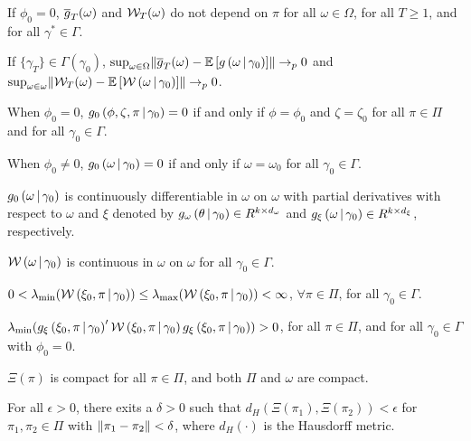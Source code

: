 \documentclass[11pt, letterpaper, twoside, final]{article}
\begin{document}
\begin{appendices}
  \begin{assump}[GMM 1]\label{ass:GMM1}
  \begin{assumplist}
    \item If $\phi_0=0$, $\sampmom(\omega)$ and $\W_{T}(\omega)$ do not depend on $\pi$ for all $\omega \in \Omega$,
      for all $T \geq 1$, and for all $\gamma^{*}\in \Gamma.$ 
      \label{ass:GMM1a}
    \item If $\lbrace \gamma_{T} \rbrace \in \Gamma\left(\gamma_0\right)$, $\sup_{\omega \in \Omega}
      \norm*{\sampmom(\omega) - \E\left[g\left(\omega \mvert \gamma_0\right)\right]} \pto 0$ and $\sup_{\omega
      \in \omega} \norm{\W_{T}(\omega)-\E\left[\W\left(\omega \mvert \gamma_0\right)\right]} \pto 0$.
      \label{ass:GMM1b}
    \item When $\phi_0 = 0$, $g_0\left(\phi, \zeta ,\pi \mvert \gamma_0\right) = 0$ if and only if $\phi
      =\phi_0$ and $\zeta = \zeta_0$ for all $\pi \in \Pi$ and for all $\gamma_0 \in \Gamma.$
      \label{ass:GMM1c}
    \item When $\phi_0 \neq 0$, $g_0\left(\omega \mvert \gamma_0\right)=0$ if and only if $\omega =\omega_0$ for all
      $\gamma_0 \in \Gamma.$
      \label{ass:GMM1d}
    \item $g_0\left(\omega \mvert \gamma_0\right)$ is continuously differentiable in $\omega $ on $\omega$ with
      partial derivatives with respect to $\omega$ and $\xi$ denoted by $g_{\omega}\left(\theta \mvert
      \gamma_0\right) \in R^{k\times d_{\omega }}$ and $g_{\xi }\left(\omega \mvert \gamma_0\right)\in R^{k\times
      d_{\xi }}$, respectively.
      \label{ass:GMM1e}
    \item $\W\left(\omega \mvert \gamma_0\right)$ is continuous in $\omega$ on $\omega$ for all $\gamma_0\in
      \Gamma$. \label{ass:GMM1f}
    \item $0 < \lambda_{\min}(\W\left(\xi_0, \pi \mvert \gamma_0\right))\leq \lambda_{\max }(\W\left(\xi_0,\pi
      \mvert \gamma_0\right)) < \infty$, $\forall \pi \in \Pi$, for all $\gamma_0 \in \Gamma$.
      \label{ass:GMM1g}
    \item $\lambda_{\min} (g_{\xi}\left(\xi_0,\pi \mvert \gamma_0\right)^{\prime} \W\left(\xi_0,\pi \mvert
      \gamma_0\right)g_{\xi }\left(\xi_0,\pi \mvert \gamma_0\right))>0$, for all $\pi \in \Pi$, and for all 
      $\gamma_0 \in \Gamma$ with $\phi_0=0.$
      \label{ass:GMM1h}
    \item$\Xi(\pi)$ is compact for all $\pi \in \Pi$, and both $\Pi$ and $\omega$ are compact.
      \label{ass:GMM1i}
    \item For all $\epsilon > 0$, there exits a $\delta > 0$ such that $d_{H}\left(\Xi \left(\pi_{1}\right),
      \Xi \left( \pi_{2}\right) \right) < \epsilon$ for $\pi_{1}, \pi_{2} \in \Pi$ with
      $\norm*{\pi_{1}-\pi_{2}} < \delta$, where $d_{H}\left( \cdot \right)$ is the Hausdorff metric.
      \label{ass:GMM1j}
  \end{assumplist}
  \end{assump}
  

\end{appendices}
\end{document}
